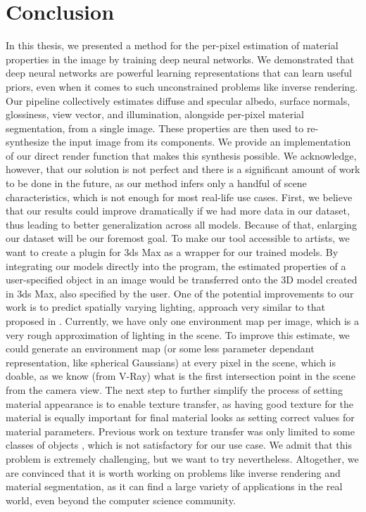 \chapter*{Conclusion}

In this thesis, we presented a method for the per-pixel estimation of material properties in the image by training deep neural networks. We demonstrated that deep neural networks are powerful learning representations that can learn useful priors, even when it comes to such unconstrained problems like inverse rendering. Our pipeline collectively estimates diffuse and specular albedo, surface normals, glossiness, view vector, and illumination, alongside per-pixel material segmentation, from a single image. These properties are then used to re-synthesize the input image from its components. We provide an implementation of our direct render function that makes this synthesis possible.
\newline
We acknowledge, however, that our solution is not perfect and there is a significant amount of work to be done in the future, as our method infers only a handful of scene characteristics, which is not enough for most real-life use cases. First, we believe that our results could improve dramatically if we had more data in our dataset, thus leading to better generalization across all models. Because of that, enlarging our dataset will be our foremost goal.
\newline
To make our tool accessible to artists, we want to create a plugin for 3ds Max as a wrapper for our trained models. By integrating our models directly into the program, the estimated properties of a user-specified object in an image would be transferred onto the 3D model created in 3ds Max, also specified by the user.
\newline
One of the potential improvements to our work is to predict spatially varying lighting, approach very similar to that proposed in \cite{li-inverse-rendering}. Currently, we have only one environment map per image, which is a very rough approximation of lighting in the scene. To improve this estimate, we could generate an environment map (or some less parameter dependant representation, like spherical Gaussians) at every pixel in the scene, which is doable, as we know (from V-Ray) what is the first intersection point in the scene from the camera view.
\newline
The next step to further simplify the process of setting material appearance is to enable texture transfer, as having good texture for the material is equally important for final material looks as setting correct values for material parameters. Previous work on texture transfer was only limited to some classes of objects \cite{texture-transfer}, which is not satisfactory for our use case. We admit that this problem is extremely challenging, but we want to try nevertheless.
\newline
Altogether, we are convinced that it is worth working on problems like inverse rendering and material segmentation, as it can find a large variety of applications in the real world, even beyond the computer science community.